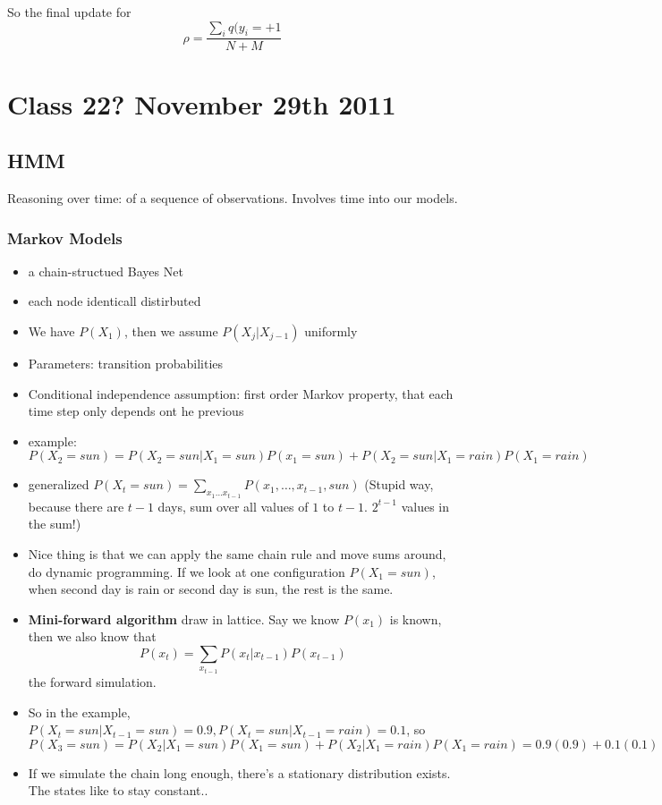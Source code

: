 So the final update for $$\rho = \frac{\sum_iq(y_i=+1}{N+M}$$

\section{Class 22? November 29th 2011}

\subsection{HMM}
\label{sec:hmm}

Reasoning over time: of a sequence of observations. Involves time into
our models.

\subsubsection{Markov Models}
\begin{itemize}
\item a chain-structued Bayes Net
\item each node identicall distirbuted
\item We have $P(X_1)$, then we assume $P(X_j|X_{j-1})$ uniformly
\item Parameters: \textsf{transition probabilities}
\item Conditional independence assumption: first order Markov
  property, that each time step only depends ont he previous
\item example: $P(X_2=sun) = P(X_2=sun|X_1=sun)P(x_1=sun) + P(X_2=sun|X_1=rain)P(X_1=rain)$
\item generalized $P(X_t=sun) = \sum_{x_1\dots x_{t-1}}P(x_1, \dots,
  x_{t-1}, sun)$ (Stupid way, because there are $t-1$ days, sum over
  all values of $1$ to $t-1$. $2^{t-1}$ values in the sum!)
\item Nice thing is that we can apply the same chain rule and move
  sums around, do dynamic programming. If we look at one configuration
  $P(X_1=sun)$, when second day is rain or second day is sun, the rest is
  the same.
\item \textbf{Mini-forward algorithm} draw in lattice. Say we know
  $P(x_1)$ is known, then we also know that $$P(x_t) =
  \sum_{x_{t-1}}P(x_t|x_{t-1})P(x_{t-1})$$
the forward simulation.
\item So in the example, $P(X_t=sun|X_{t-1}=sun) =
  0.9,P(X_t=sun|X_{t-1}=rain) = 0.1$, so $P(X_3=sun) =
P(X_2|X_1=sun)P(X_1=sun)+P(X_2|X_1=rain)P(X_1=rain) =
0.9(0.9)+0.1(0.1) = 0.82$
\item If we simulate the chain long enough, there's a stationary
  distribution exists. The states like to stay constant..
\end{itemize}

